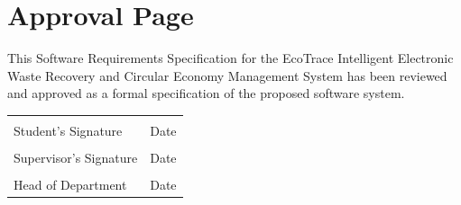 
\chapter*{Approval Page}

This Software Requirements Specification for the EcoTrace Intelligent
Electronic Waste Recovery and Circular Economy Management System has
been reviewed and approved as a formal specification of the proposed
software system.

\vspace{2cm}

\begin{tabular}{p{7cm}p{7cm}}

\hrulefill & \hrulefill \\

Student's Signature & Date \\[2cm]

\hrulefill & \hrulefill \\

Supervisor's Signature & Date \\[2cm]

\hrulefill & \hrulefill \\

Head of Department & Date \\

\end{tabular}